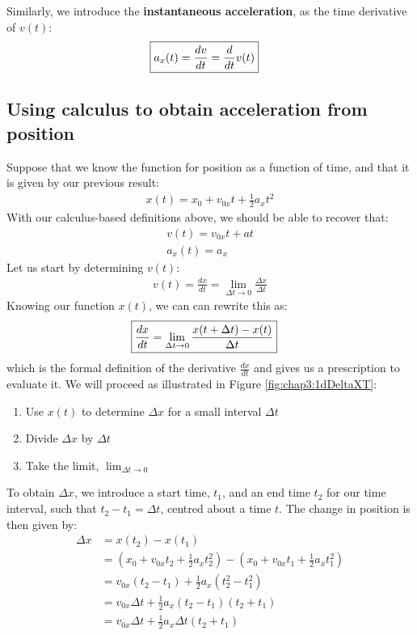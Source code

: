 Similarly, we introduce the \textbf{instantaneous acceleration}, as the time derivative of $v(t)$:
\begin{align}
\Aboxed{a_x(t)=\frac{dv}{dt}=\frac{d}{dt}v(t)}
\end{align}
\newpage
\subsection{Using calculus to obtain acceleration from position}
Suppose that we know the function for position as a function of time, and that it is given by our previous result:
\begin{align*}
x(t)=x_0+v_{0x}t+\frac{1}{2}a_xt^2
\end{align*}
With our calculus-based definitions above, we should be able to recover that:
\begin{align*}
v(t) = v_{0x}t+at\\
a_x(t) = a_x
\end{align*} 
Let us start by determining $v(t)$:
\begin{align*}
v(t) = \frac{dx}{dt}=\lim_{\Delta t\to 0} \frac{\Delta x}{\Delta t}
\end{align*}
Knowing our function $x(t)$, we can can rewrite this as:
\begin{align}
\Aboxed{ \frac{dx}{dt}=\lim_{\Delta t\to 0} \frac{x(t+\Delta t)-x(t)}{\Delta t} }
\end{align}
which is the formal definition of the derivative $\frac{dx}{dt}$ and gives us a prescription to evaluate it. We will proceed as illustrated in Figure \ref{fig:chap3:1dDeltaXT}:
\begin{enumerate}
\item Use $x(t)$ to determine $\Delta x$ for a small interval $\Delta t$
\item Divide $\Delta x$ by $\Delta t$
\item Take the limit, $\lim_{\Delta t\to 0}$
\end{enumerate}
To obtain $\Delta x$, we introduce a start time, $t_1$, and an end time $t_2$ for our time interval, such that $t_2-t_1=\Delta t$, centred about a time $t$. The change in position is then given by:
\begin{align*}
\Delta x &= x(t_2) - x(t_1)\\
&=\left(x_0+v_{0x}t_2+\frac{1}{2}a_xt_2^2\right )- \left(x_0+v_{0x}t_1+\frac{1}{2}a_xt_1^2\right )\\
&=v_{0x}(t_2-t_1)+\frac{1}{2}a_x(t_2^2-t_1^2)\\
&=v_{0x}\Delta t+\frac{1}{2}a_x(t_2-t_1)(t_2+t_1)\\
&=v_{0x}\Delta t+\frac{1}{2}a_x\Delta t (t_2+t_1)\\
\end{align*}
